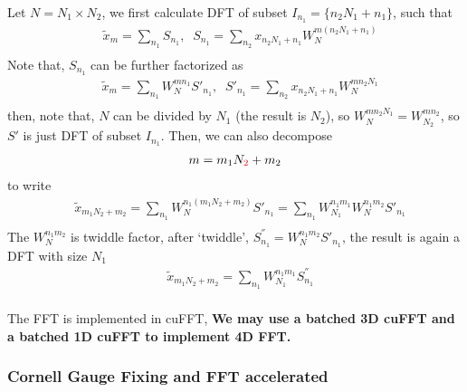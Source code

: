 Let $N=N_1\times N_2$, we first calculate DFT of subset $I_{n_1}=\{n_2N_1+n_1\}$, such that
\begin{equation}
\begin{split}
&\tilde{x}_m=\sum _{n_1} S_{n_1},\;\;S_{n_1}=\sum _{n_2}x_{n_2N_1+n_1}W_N^{m(n_2N_1+n_1)}\\
\end{split}
\end{equation}
Note that, $S_{n_1}$ can be further factorized as
\begin{equation}
\begin{split}
&\tilde{x}_m=\sum _{n_1} W_N^{mn_1}S'_{n_1},\;\;S'_{n_1}=\sum _{n_2}x_{n_2N_1+n_1}W_N^{mn_2N_1}\\
\end{split}
\end{equation}
then, note that, $N$ can be divided by $N_1$ (the result is $N_2$), so $W_N^{mn_2N_1}=W_{N_2}^{mn_2}$, so $S'$ is just DFT of subset $I_{n_1}$. Then, we can also decompose
\begin{equation}
\begin{split}
&m=m_1N_{\textcolor[rgb]{1,0,0}{2}}+m_2\\
\end{split}
\end{equation}
to write
\begin{equation}
\begin{split}
&\tilde{x}_{m_1N_2+m_2}=\sum _{n_1} W_N^{n_1(m_1N_2+m_2)}S'_{n_1}=\sum _{n_1} W_{N_1}^{n_1m_1}W_N^{n_1m_2}S'_{n_1}\\
\end{split}
\end{equation}
The $W_N^{n_1m_2}$ is twiddle factor, after `twiddle', $S^{''}_{n_1}=W_N^{n_1m_2}S'_{n_1}$, the result is again a DFT with size $N_1$
\begin{equation}
\begin{split}
&\tilde{x}_{m_1N_2+m_2}=\sum _{n_1} W_{N_1}^{n_1m_1}S^{''}_{n_1}\\
\end{split}
\end{equation}

The FFT is implemented in cuFFT, \textbf{We may use a batched 3D cuFFT and a batched 1D cuFFT to implement 4D FFT.}

\subsubsection{\label{sec:CornellGaugeFixing}Cornell Gauge Fixing and FFT accelerated}

